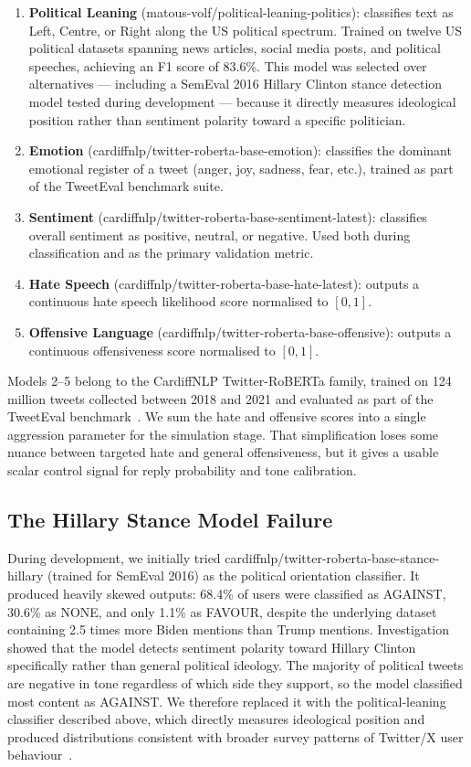 \documentclass[logo,bsc,singlespacing,parskip,online]{infthesis}
\begin{document}
\begin{enumerate}
\item \textbf{Political Leaning} (matous-volf/political-leaning-politics): classifies text as Left, Centre, or Right along the US political spectrum. Trained on twelve US political datasets spanning news articles, social media posts, and political speeches, achieving an F1 score of 83.6\%. This model was selected over alternatives --- including a SemEval 2016 Hillary Clinton stance detection model tested during development --- because it directly measures ideological position rather than sentiment polarity toward a specific politician.
\item \textbf{Emotion} (cardiffnlp/twitter-roberta-base-emotion): classifies the dominant emotional register of a tweet (anger, joy, sadness, fear, etc.), trained as part of the TweetEval benchmark suite.
\item \textbf{Sentiment} (cardiffnlp/twitter-roberta-base-sentiment-latest): classifies overall sentiment as positive, neutral, or negative. Used both during classification and as the primary validation metric.
\item \textbf{Hate Speech} (cardiffnlp/twitter-roberta-base-hate-latest): outputs a continuous hate speech likelihood score normalised to $[0, 1]$.
\item \textbf{Offensive Language} (cardiffnlp/twitter-roberta-base-offensive): outputs a continuous offensiveness score normalised to $[0, 1]$.
\end{enumerate}

Models 2--5 belong to the CardiffNLP Twitter-RoBERTa family, trained on 124 million tweets collected between 2018 and 2021 and evaluated as part of the TweetEval benchmark~\citep{barbieri2020tweeteval}. We sum the hate and offensive scores into a single aggression parameter for the simulation stage. That simplification loses some nuance between targeted hate and general offensiveness, but it gives a usable scalar control signal for reply probability and tone calibration.

\subsection{The Hillary Stance Model Failure}

During development, we initially tried cardiffnlp/twitter-roberta-base-stance-hillary (trained for SemEval 2016) as the political orientation classifier. It produced heavily skewed outputs: 68.4\% of users were classified as AGAINST, 30.6\% as NONE, and only 1.1\% as FAVOUR, despite the underlying dataset containing 2.5 times more Biden mentions than Trump mentions. Investigation showed that the model detects sentiment polarity toward Hillary Clinton specifically rather than general political ideology. The majority of political tweets are negative in tone regardless of which side they support, so the model classified most content as AGAINST. We therefore replaced it with the political-leaning classifier described above, which directly measures ideological position and produced distributions consistent with broader survey patterns of Twitter/X user behaviour~\citep{smith2021twitterbehaviors,smith2022politicalcontent}.
\end{document}
